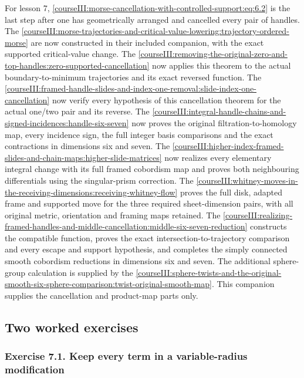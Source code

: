 For lesson 7, \eqref{courseIII:morse-cancellation-with-controlled-support:eq:6.2} is the last step after one has geometrically arranged and cancelled every pair of handles. The \cref{courseIII:morse-trajectories-and-critical-value-lowering:trajectory-ordered-morse} are now constructed in their included companion, with the exact supported critical-value change. The \cref{courseIII:removing-the-original-zero-and-top-handles:zero-supported-cancellation} now applies this theorem to the actual boundary-to-minimum trajectories and its exact reversed function. The \cref{courseIII:framed-handle-slides-and-index-one-removal:slide-index-one-cancellation} now verify every hypothesis of this cancellation theorem for the actual one/two pair and its reverse. The \cref{courseIII:integral-handle-chains-and-signed-incidences:handle-six-seven} now proves the original filtration-to-homology map, every incidence sign, the full integer basis comparisons and the exact contractions in dimensions six and seven. The \cref{courseIII:higher-index-framed-slides-and-chain-maps:higher-slide-matrices} now realizes every elementary integral change with its full framed cobordism map and proves both neighbouring differentials using the singular-prism correction. The \cref{courseIII:whitney-moves-in-the-receiving-dimensions:receiving-whitney-flow} proves the full disk, adapted frame and supported move for the three required sheet-dimension pairs, with all original metric, orientation and framing maps retained. The \cref{courseIII:realizing-framed-handles-and-middle-cancellation:middle-six-seven-reduction} constructs the compatible function, proves the exact intersection-to-trajectory comparison and every escape and support hypothesis, and completes the simply connected smooth cobordism reductions in dimensions six and seven. The additional sphere-group calculation is supplied by the \cref{courseIII:sphere-twists-and-the-original-smooth-six-sphere-comparison:twist-original-smooth-map}. This companion supplies the cancellation and product-map parts only.

\subsection{Two worked exercises}
\label{courseIII:morse-cancellation-with-controlled-support:morse-cancellation-exercises}

\label{courseIII:morse-cancellation-with-controlled-support:section-7}

\subsubsection{Exercise 7.1. Keep every term in a variable-radius modification}
\label{courseIII:morse-cancellation-with-controlled-support:exercise-7.1}

